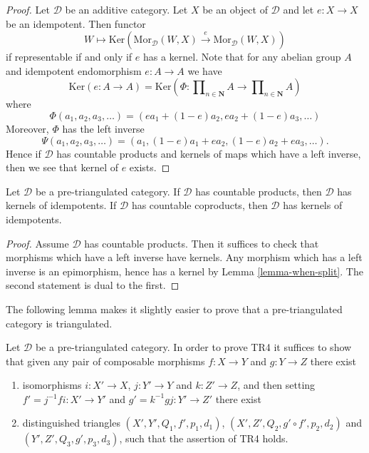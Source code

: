 \begin{proof}
Let $\mathcal{D}$ be an additive category. Let $X$ be an object of
$\mathcal{D}$ and let $e : X \to X$ be an idempotent. Then
functor
$$
W \longmapsto \text{Ker}(
\text{Mor}_{\mathcal{D}}(W, X)
\xrightarrow{e}
\text{Mor}_{\mathcal{D}}(W, X)
)
$$
if representable if and only if $e$ has a kernel. Note that for any
abelian group $A$ and idempotent endomorphism $e : A \to A$ we have
$$
\text{Ker}(e : A \to A)
= \text{Ker}(\Phi :
\prod\nolimits_{n \in \mathbf{N}} A
\to
\prod\nolimits_{n \in \mathbf{N}} A
)
$$
where
$$
\Phi(a_1, a_2, a_3, \ldots) = (ea_1 + (1 - e)a_2, ea_2 + (1 - e)a_3, \ldots)
$$
Moreover, $\Phi$ has the left inverse
$$
\Psi(a_1, a_2, a_3, \ldots) =
(a_1, (1 - e)a_1 + ea_2, (1 - e)a_2 + ea_3, \ldots).
$$
Hence if $\mathcal{D}$ has countable products and kernels of maps which
have a left inverse, then we see that kernel of $e$ exists.
\end{proof}

\begin{lemma}
\label{lemma-projectors-have-images-triangulated}
Let $\mathcal{D}$ be a pre-triangulated category.
If $\mathcal{D}$ has countable products, then $\mathcal{D}$
has kernels of idempotents.
If $\mathcal{D}$ has countable coproducts, then $\mathcal{D}$
has kernels of idempotents.
\end{lemma}

\begin{proof}
Assume $\mathcal{D}$ has countable products. Then it suffices to
check that morphisms which have a left inverse have kernels.
Any morphism which has a left inverse is an epimorphism, hence
has a kernel by
Lemma \ref{lemma-when-split}.
The second statement is dual to the first.
\end{proof}

\noindent
The following lemma makes it slightly easier to prove that a
pre-triangulated category is triangulated.

\begin{lemma}
\label{lemma-easier-axiom-four}
Let $\mathcal{D}$ be a pre-triangulated category.
In order to prove TR4 it suffices to show that given
any pair of composable morphisms
$f : X \to Y$ and $g : Y \to Z$ there exist
\begin{enumerate}
\item isomorphisms $i : X' \to X$, $j : Y' \to Y$ and
$k : Z' \to Z$, and then setting $f' = j^{-1}fi : X' \to Y'$ and
$g' = k^{-1}gj : Y' \to Z'$ there exist
\item distinguished triangles
$(X', Y', Q_1, f', p_1, d_1)$,
$(X', Z', Q_2, g' \circ f', p_2, d_2)$
and
$(Y', Z', Q_3, g', p_3, d_3)$,
such that the assertion of TR4 holds.
\end{enumerate}
\end{lemma}

